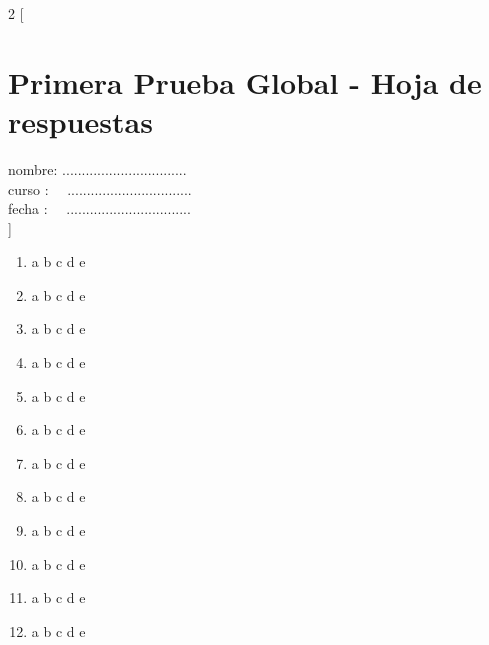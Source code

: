 \documentclass[8pt]{article}
\begin{document}
    \setcounter{page}{0}
    \setcounter{page}{1}
 \newpage  
 \begin{multicols*}{2}
[
\section{Primera Prueba Global - Hoja de respuestas}
nombre:   ................................\\
curso :     \ \ ................................\\
fecha :   \ \ ................................\\
]
\begin{enumerate}
\item \large \textcircled{\small{a}} \textcircled{\small{b}} \textcircled{\small{c}} \textcircled{\small{d}} \textcircled{\small{e}}
\item \large \textcircled{\small{a}} \textcircled{\small{b}} \textcircled{\small{c}} \textcircled{\small{d}} \textcircled{\small{e}}
\item \large \textcircled{\small{a}} \textcircled{\small{b}} \textcircled{\small{c}} \textcircled{\small{d}} \textcircled{\small{e}}
\item \large \textcircled{\small{a}} \textcircled{\small{b}} \textcircled{\small{c}} \textcircled{\small{d}} \textcircled{\small{e}}
\item \large \textcircled{\small{a}} \textcircled{\small{b}} \textcircled{\small{c}} \textcircled{\small{d}} \textcircled{\small{e}}
\item \large \textcircled{\small{a}} \textcircled{\small{b}} \textcircled{\small{c}} \textcircled{\small{d}} \textcircled{\small{e}}
\item \large \textcircled{\small{a}} \textcircled{\small{b}} \textcircled{\small{c}} \textcircled{\small{d}} \textcircled{\small{e}}
\item \large \textcircled{\small{a}} \textcircled{\small{b}} \textcircled{\small{c}} \textcircled{\small{d}} \textcircled{\small{e}}
\item \large \textcircled{\small{a}} \textcircled{\small{b}} \textcircled{\small{c}} \textcircled{\small{d}} \textcircled{\small{e}}
\item \large \textcircled{\small{a}} \textcircled{\small{b}} \textcircled{\small{c}} \textcircled{\small{d}} \textcircled{\small{e}}
\item \large \textcircled{\small{a}} \textcircled{\small{b}} \textcircled{\small{c}} \textcircled{\small{d}} \textcircled{\small{e}}
\item \large \textcircled{\small{a}} \textcircled{\small{b}} \textcircled{\small{c}} \textcircled{\small{d}} \textcircled{\small{e}}

\end{enumerate}
\end{multicols*}
\end{document}
